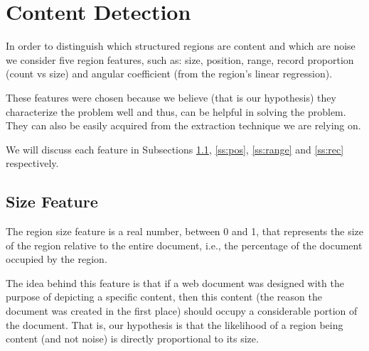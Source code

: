 \section{Content Detection}\label{sec:content}
In order to distinguish which structured regions are content and which are noise
we consider five region features, such as: size, position, range, record
proportion (count vs size) and angular coefficient (from the region's linear
regression).

These features were chosen because we believe (that is our hypothesis) they
characterize the problem well and thus, can be helpful in solving the problem.
They can also be easily acquired from the extraction technique we are relying
on.

We will discuss each feature in Subsections \ref{ss:size}, \ref{ss:pos},
\ref{ss:range} and \ref{ss:rec} respectively.

\subsection{Size Feature}\label{ss:size}
The region size feature is a real number, between 0 and 1, that represents the
size of the region relative to the entire document, i.e., the percentage of the
document occupied by the region.

The idea behind this feature is that if a web document was designed with the
purpose of depicting a specific content, then this content (the reason the
document was created in the first place) should occupy a considerable portion of
the document. That is, our hypothesis is that the likelihood of a region being
content (and not noise) is directly proportional to its size.

